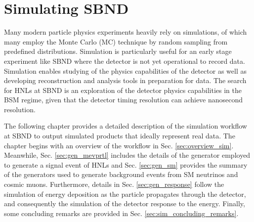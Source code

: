 
\chapter{Simulating SBND}
\label{ChapterSim}

\ifpdf
    \graphicspath{{Chapter5/Figs/Raster/}{Chapter5/Figs/PDF/}{Chapter5/Figs/}}
\else
    \graphicspath{{Chapter5/Figs/Vector/}{Chapter5/Figs/}}
\fi


Many modern particle physics experiments heavily rely on simulations, of which many employ the Monte Carlo (MC) technique by random sampling from predefined distributions.
Simulation is particularly useful for an early stage experiment like SBND where the detector is not yet operational to record data.
Simulation enables studying of the physics capabilities of the detector as well as developing reconstruction and analysis tools in preparation for data.
The search for HNLs at SBND is an exploration of the detector physics capabilities in the BSM regime, given that the detector timing resolution can achieve nanosecond resolution.

The following chapter provides a detailed description of the simulation workflow at SBND to output simulated products that ideally represent real data.
The chapter begins with an overview of the workflow in Sec. \ref{sec:overview_sim}.
Meanwhile, Sec. \ref{sec:gen_mevprtl} includes the details of the generator employed to generate a signal event of HNLs and Sec. \ref{sec:gen_sm} provides the summary of the generators used to generate background events from SM neutrinos and cosmic muons.
Furthermore, details in Sec. \ref{sec:gen_response} follow the simulation of energy deposition as the particle propagates through the detector, and consequently the simulation of the detector response to the energy.
Finally, some concluding remarks are provided in Sec. \ref{sec:sim_concluding_remarks}.

\newpage


